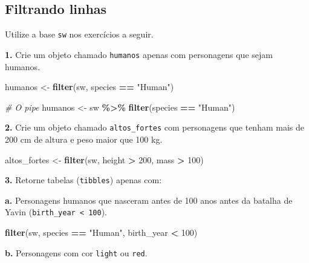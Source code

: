 \documentclass[
]{book}
\newenvironment{Shaded}{\begin{snugshade}}{\end{snugshade}}
\newcommand{\CommentTok}[1]{\textcolor[rgb]{0.56,0.35,0.01}{\textit{#1}}}
\newcommand{\DecValTok}[1]{\textcolor[rgb]{0.00,0.00,0.81}{#1}}
\newcommand{\FunctionTok}[1]{\textcolor[rgb]{0.13,0.29,0.53}{\textbf{#1}}}
\newcommand{\NormalTok}[1]{#1}
\newcommand{\OtherTok}[1]{\textcolor[rgb]{0.56,0.35,0.01}{#1}}
\newcommand{\SpecialCharTok}[1]{\textcolor[rgb]{0.81,0.36,0.00}{\textbf{#1}}}
\newcommand{\StringTok}[1]{\textcolor[rgb]{0.31,0.60,0.02}{#1}}
\begin{document}
\subsection{Filtrando linhas}\label{filtrando-linhas}

Utilize a base \texttt{sw} nos exercícios a seguir.

\textbf{1.} Crie um objeto chamado \texttt{humanos} apenas com personagens que sejam
humanos.

\begin{Shaded}
\begin{Highlighting}[]
\NormalTok{humanos }\OtherTok{\textless{}{-}} \FunctionTok{filter}\NormalTok{(sw, species }\SpecialCharTok{==} \StringTok{"Human"}\NormalTok{)}

\CommentTok{\# O pipe}
\NormalTok{humanos }\OtherTok{\textless{}{-}}\NormalTok{ sw }\SpecialCharTok{\%\textgreater{}\%} 
  \FunctionTok{filter}\NormalTok{(species }\SpecialCharTok{==} \StringTok{"Human"}\NormalTok{)}
\end{Highlighting}
\end{Shaded}

\textbf{2.} Crie um objeto chamado \texttt{altos\_fortes} com personagens que tenham
mais de 200 cm de altura e peso maior que 100 kg.

\begin{Shaded}
\begin{Highlighting}[]
\NormalTok{altos\_fortes }\OtherTok{\textless{}{-}} \FunctionTok{filter}\NormalTok{(sw, height }\SpecialCharTok{\textgreater{}} \DecValTok{200}\NormalTok{, mass }\SpecialCharTok{\textgreater{}} \DecValTok{100}\NormalTok{)}
\end{Highlighting}
\end{Shaded}

\textbf{3.} Retorne tabelas (\texttt{tibbles}) apenas com:

\textbf{a.} Personagens humanos que nasceram antes de 100 anos antes da
batalha de Yavin (\texttt{birth\_year\ \textless{}\ 100}).

\begin{Shaded}
\begin{Highlighting}[]
\FunctionTok{filter}\NormalTok{(sw, species }\SpecialCharTok{==} \StringTok{"Human"}\NormalTok{, birth\_year }\SpecialCharTok{\textless{}} \DecValTok{100}\NormalTok{)}
\end{Highlighting}
\end{Shaded}

\textbf{b.} Personagens com cor \texttt{light} ou \texttt{red}.
\end{document}

